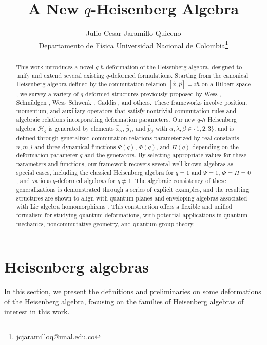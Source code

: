 \documentclass[12pt,a4paper]{article}
\title{\textbf{A New $q$-Heisenberg Algebra}}
\author{Julio Cesar Jaramillo Quiceno\\Departamento de Física Universidad Nacional de Colombia\thanks{jcjaramilloq@unal.edu.co}}
\date{}
\theoremstyle{plain}
\theoremstyle{definition}
\theoremstyle{remark}
\begin{document}
\maketitle
\begin{abstract}
This work introduces a novel $q$-$\hbar$ deformation of the Heisenberg algebra, designed to unify and extend several existing $q$-deformed formulations. Starting from the canonical Heisenberg algebra defined by the commutation relation $[\hat{x}, \hat{p}] = i\hbar$ on a Hilbert space \cite{Zettili2009}, we survey a variety of $q$-deformed structures previously proposed by Wess \cite{Wess2000}, Schmüdgen \cite{Schmudgen1999}, Wess--Schwenk \cite{Wess-Schwenk1992}, Gaddis \cite{Jasson-Gaddis2016}, and others. These frameworks involve position, momentum, and auxiliary operators that satisfy nontrivial commutation rules and algebraic relations incorporating deformation parameters. Our new $q$-$\hbar$ Heisenberg algebra $\mathcal{H}_q$ is generated by elements $\hat{x}_\alpha$, $\hat{y}_\lambda$, and $\hat{p}_\beta$ with $\alpha, \lambda, \beta \in \{1,2,3\}$, and is defined through generalized commutation relations parameterized by real constants $n, m, l$ and three dynamical functions $\Psi(q)$, $\Phi(q)$, and $\Pi(q)$ depending on the deformation parameter $q$ and the generators. By selecting appropriate values for these parameters and functions, our framework recovers several well-known algebras as special cases, including the classical Heisenberg algebra for $q = 1$ and $\Psi = 1$, $\Phi = \Pi = 0$, and various $q$-deformed algebras for $q \neq 1$. The algebraic consistency of these generalizations is demonstrated through a series of explicit examples, and the resulting structures are shown to align with quantum planes \cite{Yuri-Manin2010} and enveloping algebras associated with Lie algebra homomorphisms \cite{Reyes2014a}. This construction offers a flexible and unified formalism for studying quantum deformations, with potential applications in quantum mechanics, noncommutative geometry, and quantum group theory.
\end{abstract}
\section{Heisenberg algebras}\label{Heis-alg-sect1}

In this section, we present the definitions and preliminaries on some deformations of the Heisenberg algebra, focusing on the families of Heisenberg algebras of interest in this work.
\end{document}
